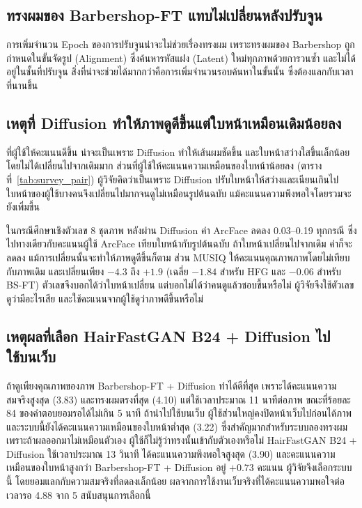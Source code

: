 \subsection{ทรงผมของ Barbershop-FT แทบไม่เปลี่ยนหลังปรับจูน}

การเพิ่มจำนวน Epoch ของการปรับจูนน่าจะไม่ช่วยเรื่องทรงผม เพราะทรงผมของ Barbershop ถูกกำหนดในขั้นจัดรูป (Alignment)
ซึ่งค้นหารหัสแฝง (Latent) ใหม่ทุกภาพด้วยการวนซ้ำ และไม่ได้อยู่ในชั้นที่ปรับจูน
สิ่งที่น่าจะช่วยได้มากกว่าคือการเพิ่มจำนวนรอบค้นหาในขั้นนั้น ซึ่งต้องแลกกับเวลาที่นานขึ้น

\subsection{เหตุที่ Diffusion ทำให้ภาพดูดีขึ้นแต่ใบหน้าเหมือนเดิมน้อยลง}

ที่ผู้ใช้ให้คะแนนดีขึ้น น่าจะเป็นเพราะ Diffusion ทำให้เส้นผมชัดขึ้น
และใบหน้าสว่างใสขึ้นเล็กน้อย โดยไม่ได้เปลี่ยนไปจากเดิมมาก
ส่วนที่ผู้ใช้ให้คะแนนความเหมือนของใบหน้าน้อยลง (ตารางที่~\ref{tab:survey_pair})
ผู้วิจัยคิดว่าเป็นเพราะ Diffusion ปรับใบหน้าให้สว่างและเนียนเกินไป
ใบหน้าของผู้ใช้บางคนจึงเปลี่ยนไปมากจนดูไม่เหมือนรูปต้นฉบับ แม้คะแนนความพึงพอใจโดยรวมจะยังเพิ่มขึ้น

ในกรณีศึกษาเชิงตัวเลข 8 ชุดภาพ หลังผ่าน Diffusion ค่า ArcFace ลดลง 0.03--0.19 ทุกกรณี ซึ่งไปทางเดียวกับคะแนนผู้ใช้
ArcFace เทียบใบหน้ากับรูปต้นฉบับ ถ้าใบหน้าเปลี่ยนไปจากเดิม ค่าก็จะลดลง แม้การเปลี่ยนนั้นจะทำให้ภาพดูดีขึ้นก็ตาม
ส่วน MUSIQ ให้คะแนนคุณภาพภาพโดยไม่เทียบกับภาพเดิม และเปลี่ยนเพียง $-4.3$ ถึง $+1.9$ (เฉลี่ย $-1.84$ สำหรับ HFG และ $-0.06$ สำหรับ BS-FT)
ตัวเลขจึงบอกได้ว่าใบหน้าเปลี่ยน แต่บอกไม่ได้ว่าคนดูแล้วชอบขึ้นหรือไม่
ผู้วิจัยจึงใช้ตัวเลขดูว่ามีอะไรเสีย และใช้คะแนนจากผู้ใช้ดูว่าภาพดีขึ้นหรือไม่

\subsection{เหตุผลที่เลือก HairFastGAN B24 + Diffusion ไปใช้บนเว็บ}

ถ้าดูเพียงคุณภาพของภาพ Barbershop-FT + Diffusion ทำได้ดีที่สุด
เพราะได้คะแนนความสมจริงสูงสุด (3.83) และทรงผมตรงที่สุด (4.10)
แต่ใช้เวลาประมาณ 11 นาทีต่อภาพ ขณะที่ร้อยละ 84 ของคำตอบยอมรอได้ไม่เกิน 5 นาที
ถ้านำไปใช้บนเว็บ ผู้ใช้ส่วนใหญ่คงปิดหน้าเว็บไปก่อนได้ภาพ
และระบบนี้ยังได้คะแนนความเหมือนของใบหน้าต่ำสุด (3.22) ซึ่งสำคัญมากสำหรับระบบลองทรงผม
เพราะถ้าผลออกมาไม่เหมือนตัวเอง ผู้ใช้ก็ไม่รู้ว่าทรงนั้นเข้ากับตัวเองหรือไม่
HairFastGAN B24 + Diffusion ใช้เวลาประมาณ 13 วินาที ได้คะแนนความพึงพอใจสูงสุด (3.90)
และคะแนนความเหมือนของใบหน้าสูงกว่า Barbershop-FT + Diffusion อยู่ $+0.73$ คะแนน
ผู้วิจัยจึงเลือกระบบนี้ โดยยอมแลกกับความสมจริงที่ลดลงเล็กน้อย
ผลจากการใช้งานเว็บจริงที่ได้คะแนนความพอใจต่อเวลารอ 4.88 จาก 5 สนับสนุนการเลือกนี้

